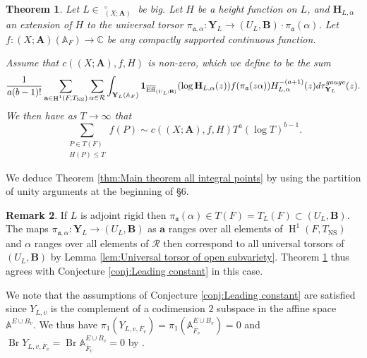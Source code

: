 \documentclass[a4paper,11pt,reqno]{amsart}
\newcommand{\C}{\mathbb{C}}
\newcommand{\A}{\mathbb{A}}
\DeclareMathOperator{\NS}{NS}
\DeclareMathOperator{\Eff}{\overline{Eff}}
\DeclareMathOperator{\Br}{Br}
\DeclareMathOperator{\HH}{H}
\newtheorem{theorem}{Theorem}[section]
\theoremstyle{definition}
\newtheorem{remark}[theorem]{Remark}
\begin{document}
\begin{theorem}\label{thm: Main theorem for general heights}
	Let $L \in \Eff_{(X ; \mathbf{A})}^{\circ}$ be big. Let $H$ be a height function on $L$, and $\mathbf{H}_{L, \alpha}$ an extension of $H$ to the universal torsor $\pi_{\mathfrak{a}, \alpha}: \mathbf{Y}_L \to (U_L, \mathbf{B}) \cdot \pi_{\mathfrak{a}}(\alpha)$. Let $f: (X ; \mathbf{A})(\A_F) \to \C$ be any compactly supported continuous function.
	
	Assume that $c((X ; \mathbf{A}), f , H)$ is non-zero, which we define to be the sum
	\[
	\frac{1}{a (b - 1)!} \sum_{\mathbf{a} \in \HH^1(F, T_{\NS})} \sum_{\alpha \in \mathcal{R}} \int_{\mathbf{Y}_L(\A_F)} \mathbf{1}_{\Eff_{(U_L ; \mathbf{B})}}(\log \mathbf{H}_{L, \alpha}(z)) f(\pi_{\mathfrak{a}}(z \alpha)) H_{L, \alpha}^{-(a +1)}(z) d\tau_{\mathbf{Y}_L}^{\emph{gauge}}(z).
	\]
	We then have as $T \to \infty$ that 
	\[\sum_{\substack{P \in T(F) \\ H(P) \leq T}} f(P) \sim c((X ; \mathbf{A}), f , H) T^a (\log T)^{b - 1}.\]
\end{theorem}
We deduce Theorem \ref{thm:Main theorem all integral points} by using the partition of unity arguments at the beginning of \S6.
\begin{remark}
	If $L$ is adjoint rigid then $\pi_{\mathfrak{a}}(\alpha) \in T(F) = T_L(F) \subset (U_L, \mathbf{B})$. The maps $\pi_{\mathfrak{a}, \alpha}: \mathbf{Y}_L \to (U_L, \mathbf{B})$ as $\mathbf{a}$ ranges over all elements of $\HH^1(F, T_{\NS})$ and $\alpha$ ranges over all elements of $\mathcal{R}$ then correspond to all universal torsors of $(U_L, \mathbf{B})$ by Lemma \ref{lem:Universal torsor of open subvariety}. Theorem \ref{thm: Main theorem for general heights} thus agrees with Conjecture \ref{conj:Leading constant} in this case.
	
	 We note that the assumptions of Conjecture \ref{conj:Leading constant} are satisfied since $Y_{L, v}$ is the complement of a codimension $2$ subspace in the affine space $\A^{E \cup B_v}$. We thus have $\pi_1(Y_{L, v, \overline{F}_v}) = \pi_1(\A_{\overline{F}_v}^{E \cup B_v}) = 0$ and $\Br Y_{L, v, \overline{F}_v} = \Br \A_{\overline{F}_v}^{E \cup B_v} = 0$ by \cite[Thm.~3.7.1, Thm.~6.1.1]{Colliot2021Brauer}.
\end{remark}

 

\end{document}
